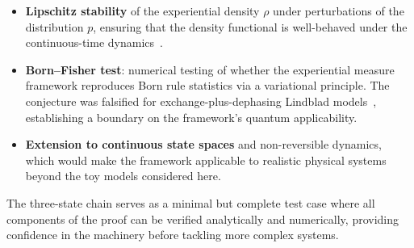 \documentclass[11pt]{article}
\begin{document}
\begin{itemize}
\item \textbf{Lipschitz stability} of the experiential density
  $\rho$ under perturbations of the distribution $p$, ensuring that
  the density functional is well-behaved under the continuous-time
  dynamics~\cite{Ehrlich2026b}.

\item \textbf{Born--Fisher test}: numerical testing of whether the
  experiential measure framework reproduces Born rule statistics via a
  variational principle.  The conjecture was falsified for
  exchange-plus-dephasing Lindblad models~\cite{Ehrlich2026c},
  establishing a boundary on the framework's quantum applicability.

\item \textbf{Extension to continuous state spaces} and
  non-reversible dynamics, which would make the framework applicable
  to realistic physical systems beyond the toy models considered here.
\end{itemize}

The three-state chain serves as a minimal but complete test case
where all components of the proof can be verified analytically
and numerically, providing confidence in the machinery before
tackling more complex systems.

\end{document}
